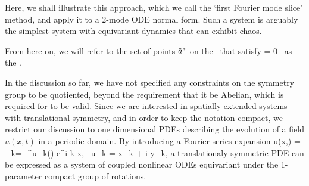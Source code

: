 Here, we shall illustrate this approach, which we call the
`first Fourier mode slice' method, and apply it to a 2-mode ODE normal form. Such
a system is arguably the simplest system with  equivariant dynamics that
can exhibit chaos.

From here on, we will refer to the set of points $\hat{a}^*$ on the \slicePlane\ that satisfy
\beq
\braket{\groupTan(\sspRed^*)}{\sliceTan{}} = 0
\,
as the \emph{\sliceBord}.

In the discussion so far, we have not specified any constraints on the symmetry group
to be quotiented, beyond the requirement that it be Abelian, which is required for 
to be valid.
Since we are interested in spatially extended systems with
translational symmetry, and in order to keep the notation compact,
we restrict our discussion to one dimensional PDEs describing
the evolution of a field $u(x,t)$ in a periodic domain.
By introducing a Fourier series expansion
\beq
	u(x,\zeit) = \sum\limits_{k=- \infty}^\infty u_k\left(\zeit\right) e^{i k x}, \,\,\,u_k = x_k + i y_k,
a translationaly symmetric PDE can be expressed as a system of coupled nonlinear
ODEs equivariant under the 1-parameter compact group of  rotations.

